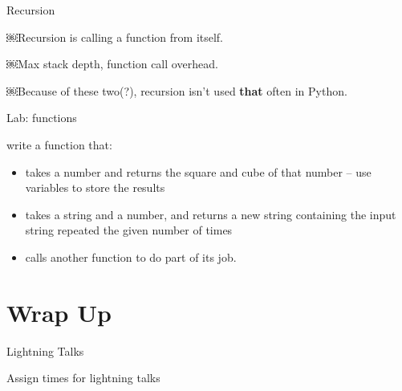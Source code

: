 \documentclass{beamer}
\begin{document}
\begin{frame}[fragile]{Recursion}

\vspace{0.5in}
{\Large￼Recursion is calling a function from itself.}

\vspace{0.5in}
{\Large￼Max stack depth, function call overhead.}

\vspace{0.5in}
{\Large￼Because of these two(?), recursion isn't used {\bf that} often in Python.}

\end{frame}

\begin{frame}[fragile]{Lab: functions}

{\Large write a function that:}
\begin{itemize}
  \item takes a number and returns the square and cube of that number
   -- use variables to store the results
  \item takes a string and a number, and returns a new string containing the input string repeated the given number of times
  \item calls another function to do part of its job.
  
\end{itemize}

\end{frame}


\section{Wrap Up}

\begin{frame}{Lightning Talks}

\vspace{0.5in}
{\Large Assign times for lightning talks}

\vspace{0.5in}

\end{frame}
\end{document}
